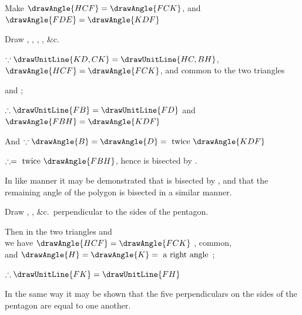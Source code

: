 \documentclass[booklanguage=english]{byrnebook}
\begin{document}
\begin{center}
Make $\drawAngle{HCF} = \drawAngle{FCK}$, and $\drawAngle{FDE} = \drawAngle{KDF}$ 

Draw , , , , \&c.

$\because \drawUnitLine{KD,CK} = \drawUnitLine{HC,BH}$, $\drawAngle{HCF} = \drawAngle{FCK}$, and  common to the two triangles %

and
;

$\therefore \drawUnitLine{FB} = \drawUnitLine{FD}$ and $\drawAngle{FBH} = \drawAngle{KDF}$ 

And $\because \drawAngle{B} = \drawAngle{D} = \mbox{ twice } \drawAngle{KDF}$ %

$\therefore = \mbox{ twice } \drawAngle{FBH}$, hence  is bisected by .

In like manner it may be demonstrated that  is bisected by , and that the remaining angle of the polygon is bisected in a similar manner.

Draw , , \&c.\ perpendicular to the sides of the pentagon.

Then in the two triangles
and
\\
we have $\drawAngle{HCF} = \drawAngle{FCK}$ \byref{\constref},  common,\\
and $\drawAngle{H} = \drawAngle{K} = \mbox{ a right angle }$;

$\therefore \drawUnitLine{FK} = \drawUnitLine{FH}$ 
\end{center}

In the same way it may be shown that the five perpendiculars on the sides of the pentagon are equal to one another.
\end{document}
